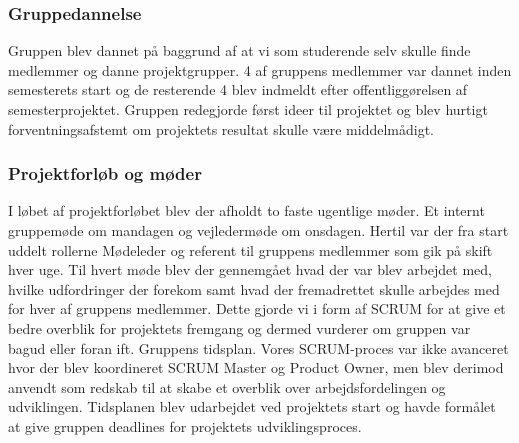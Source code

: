 \subsubsection{Gruppedannelse}
Gruppen blev dannet på baggrund af at vi som studerende selv skulle finde medlemmer og danne projektgrupper. 4 af gruppens medlemmer var dannet inden semesterets start og de resterende 4 blev indmeldt efter offentliggørelsen af semesterprojektet. Gruppen redegjorde først ideer til projektet og blev hurtigt forventningsafstemt om projektets resultat skulle være middelmådigt. 

\subsubsection{Projektforløb og møder}
I løbet af projektforløbet blev der afholdt to faste ugentlige møder. Et internt gruppemøde om mandagen og vejledermøde om onsdagen. Hertil var der fra start uddelt rollerne Mødeleder og referent til gruppens medlemmer som gik på skift hver uge. Til hvert møde blev der gennemgået hvad der var blev arbejdet med, hvilke udfordringer der forekom samt hvad der fremadrettet skulle arbejdes med for hver af gruppens medlemmer. Dette gjorde vi i form af SCRUM for at give et bedre overblik for projektets fremgang og dermed vurderer om gruppen var bagud eller foran ift. Gruppens tidsplan. Vores SCRUM-proces var ikke avanceret hvor der blev koordineret SCRUM Master og Product Owner, men blev derimod anvendt som redskab til at skabe et overblik over arbejdsfordelingen og udviklingen. Tidsplanen blev udarbejdet ved projektets start og havde formålet at give gruppen deadlines for projektets udviklingsproces. 

